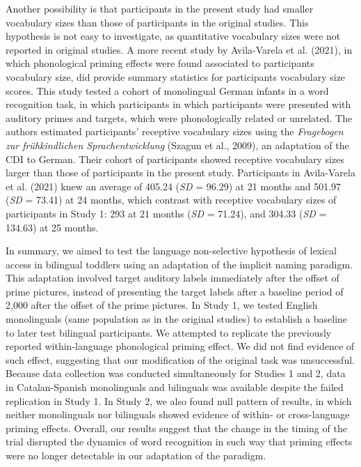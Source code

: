 \documentclass[
  12pt,
  b5paperpaper,
  twoside]{scrreprt}
\begin{document}
Another possibility is that participants in the present study had
smaller vocabulary sizes than those of participants in the original
studies. This hypothesis is not easy to investigate, as quantitative
vocabulary sizes were not reported in original studies. A more recent
study by Avila-Varela et al. (2021), in which phonological priming
effects were found associated to participants vocabulary size, did
provide summary statistics for participants vocabulary size scores. This
study tested a cohort of monolingual German infants in a word
recognition task, in which participants in which participants were
presented with auditory primes and targets, which were phonologically
related or unrelated. The authors estimated participants' receptive
vocabulary sizes using the \emph{Fragebogen zur frühkindlichen
Sprachentwicklung} (Szagun et al., 2009), an adaptation of the CDI to
German. Their cohort of participants showed receptive vocabulary sizes
larger than those of participants in the present study. Participants in
Avila-Varela et al. (2021) knew an average of 405.24 (\emph{SD} = 96.29)
at 21 months and 501.97 (\emph{SD} = 73.41) at 24 months, which contrast
with receptive vocabulary sizes of participants in Study 1: 293 at 21
months (\emph{SD} = 71.24), and 304.33 (\emph{SD} = 134.63) at 25
months.

In summary, we aimed to test the language non-selective hypothesis of
lexical access in bilingual toddlers using an adaptation of the implicit
naming paradigm. This adaptation involved target auditory labels
immediately after the offset of prime pictures, instead of presenting
the target labels after a baseline period of 2,000 after the offset of
the prime pictures. In Study 1, we tested English monolinguals (same
population as in the original studies) to establish a baseline to later
test bilingual participants. We attempted to replicate the previously
reported within-language phonological priming effect. We did not find
evidence of such effect, suggesting that our modification of the
original task was unsuccessful. Because data collection was conducted
simultaneously for Studies 1 and 2, data in Catalan-Spanish monolinguals
and bilinguals was available despite the failed replication in Study 1.
In Study 2, we also found null pattern of results, in which neither
monolinguals nor bilinguals showed evidence of within- or cross-language
priming effects. Overall, our results suggest that the change in the
timing of the trial disrupted the dynamics of word recognition in such
way that priming effects were no longer detectable in our adaptation of
the paradigm.
\end{document}
